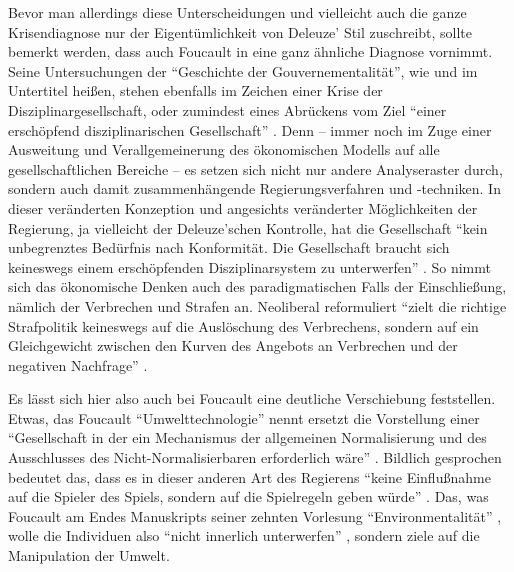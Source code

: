 \documentclass[12pt,
               DIV13,
               paper=a4,
               twoside=false,
               onehalfspacing,
               bibliography=totoc,
               toc=graduated,
               draft,
               ]{scrartcl}
\newcommand{\pc}[2]{\parencite[#1]{#2}}
\begin{document}
Bevor man allerdings diese Unterscheidungen und vielleicht auch die
ganze Krisendiagnose nur der Eigentümlichkeit von Deleuze' Stil
zuschreibt, sollte bemerkt werden, dass auch Foucault in \cite{gbp}
eine ganz ähnliche Diagnose vornimmt. Seine Untersuchungen der
"`Geschichte der Gouvernementalität"', wie \cite{stb} und \cite{gbp}
im Untertitel heißen, stehen ebenfalls im Zeichen einer Krise der
Disziplinargesellschaft, oder zumindest eines Abrückens vom Ziel
"`einer erschöpfend disziplinarischen Gesellschaft"' \pc{359}{gbp}.
Denn -- immer noch im Zuge einer Ausweitung und Verallgemeinerung des
ökonomischen Modells auf alle gesellschaftlichen Bereiche -- es setzen
sich nicht nur andere Analyseraster durch, sondern auch damit
zusammenhängende Regierungsverfahren und -techniken. In dieser
veränderten Konzeption und angesichts veränderter Möglichkeiten der
Regierung, ja vielleicht der Deleuze'schen Kontrolle, hat die
Gesellschaft "`kein unbegrenztes Bedürfnis nach Konformität. Die
Gesellschaft braucht sich keineswegs einem erschöpfenden
Disziplinarsystem zu unterwerfen"' \pc{354}{gbp}. So nimmt sich das
ökonomische Denken auch des paradigmatischen Falls der Einschließung,
nämlich der Verbrechen und Strafen an. Neoliberal reformuliert "`zielt
die richtige Strafpolitik keineswegs auf die Auslöschung des
Verbrechens, sondern auf ein Gleichgewicht zwischen den Kurven des
Angebots an Verbrechen und der negativen Nachfrage"' \pc{354}{gbp}.

Es lässt sich hier also auch bei Foucault eine deutliche Verschiebung
feststellen. Etwas, das Foucault "`Umwelttechnologie"' nennt
\pc{359}{gbp} ersetzt die Vorstellung einer "`Gesellschaft in der ein
Mechanismus der allgemeinen Normalisierung und des Ausschlusses des
Nicht-Normalisierbaren erforderlich wäre"' \pc{359}{gbp}. Bildlich
gesprochen bedeutet das, dass es in dieser anderen Art des Regierens
"`keine Einflußnahme auf die Spieler des Spiels, sondern auf die
Spielregeln geben würde"' \pc{359}{gbp}. Das, was Foucault am Endes
Manuskripts seiner zehnten Vorlesung "`Environmentalität"' \pc{Fn., S.
361}{gbp}, wolle die Individuen also "`nicht innerlich unterwerfen"'
\pc{359}{gbp}, sondern ziele auf die Manipulation der Umwelt.
\end{document}
